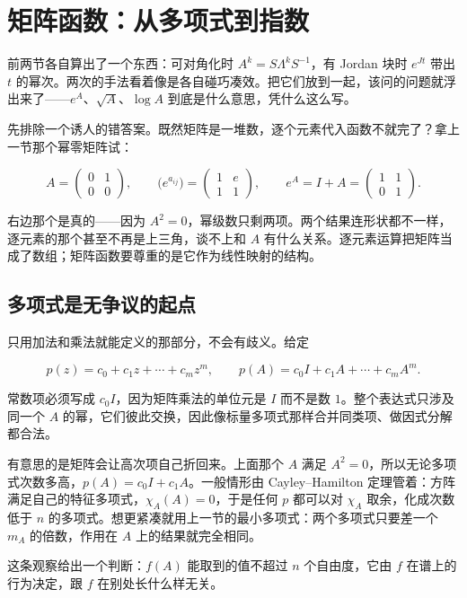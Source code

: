 \section{矩阵函数：从多项式到指数}
\label{sec:03-Linear-Algebra/05-Eigenvalues-and-Eigenvectors/04}

前两节各自算出了一个东西：可对角化时 \(A^k=S\Lambda^kS^{-1}\)，有 Jordan 块时 \(e^{Jt}\) 带出 \(t\) 的幂次。两次的手法看着像是各自碰巧凑效。把它们放到一起，该问的问题就浮出来了——\(e^A\)、\(\sqrt{A}\)、\(\log A\) 到底是什么意思，凭什么这么写。

先排除一个诱人的错答案。既然矩阵是一堆数，逐个元素代入函数不就完了？拿上一节那个幂零矩阵试：

\[
A=\begin{pmatrix}0&1\\0&0\end{pmatrix},
\qquad
\bigl(e^{a_{ij}}\bigr)=\begin{pmatrix}1&e\\1&1\end{pmatrix},
\qquad
e^{A}=I+A=\begin{pmatrix}1&1\\0&1\end{pmatrix}.
\]

右边那个是真的——因为 \(A^2=0\)，幂级数只剩两项。两个结果连形状都不一样，逐元素的那个甚至不再是上三角，谈不上和 \(A\) 有什么关系。逐元素运算把矩阵当成了数组；矩阵函数要尊重的是它作为线性映射的结构。

\subsection{多项式是无争议的起点}

只用加法和乘法就能定义的那部分，不会有歧义。给定

\[
p(z)=c_0+c_1z+\cdots+c_mz^m,
\qquad
p(A)=c_0I+c_1A+\cdots+c_mA^m .
\]

常数项必须写成 \(c_0I\)，因为矩阵乘法的单位元是 \(I\) 而不是数 \(1\)。整个表达式只涉及同一个 \(A\) 的幂，它们彼此交换，因此像标量多项式那样合并同类项、做因式分解都合法。

有意思的是矩阵会让高次项自己折回来。上面那个 \(A\) 满足 \(A^2=0\)，所以无论多项式次数多高，\(p(A)=c_0I+c_1A\)。一般情形由 Cayley--Hamilton 定理管着：方阵满足自己的特征多项式，\(\chi_A(A)=0\)，于是任何 \(p\) 都可以对 \(\chi_A\) 取余，化成次数低于 \(n\) 的多项式。想更紧凑就用上一节的最小多项式：两个多项式只要差一个 \(m_A\) 的倍数，作用在 \(A\) 上的结果就完全相同。

这条观察给出一个判断：\(f(A)\) 能取到的值不超过 \(n\) 个自由度，它由 \(f\) 在谱上的行为决定，跟 \(f\) 在别处长什么样无关。


